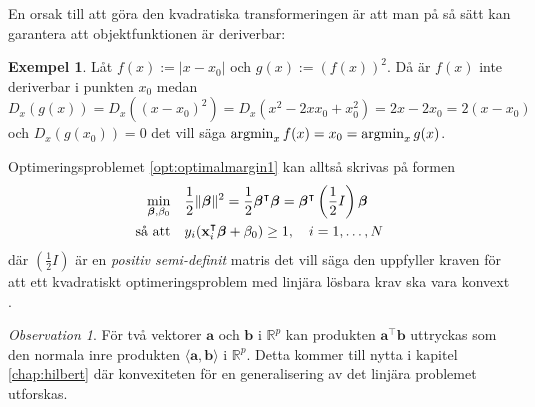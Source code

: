 \documentclass[a4paper, 12pt]{report}
\theoremstyle{definition}
\newtheorem{ex}{Exempel}[section]
\theoremstyle{remark}
\newtheorem*{rem}{Observation}
\newcommand{\bfbeta}{{\boldsymbol{\beta}}}
\begin{document}
En orsak till att göra den kvadratiska transformeringen är att man på så sätt kan garantera att objektfunktionen är deriverbar:
\begin{ex}
	Låt $f(x):=|x-x_0|$ och $g(x):=\left(f(x)\right)^2$. Då är $f(x)$ inte deriverbar i punkten $x_0$ medan $D_x\left(g(x)\right)=D_x\left(\left(x-x_0\right)^2\right)=D_x\left(x^2-2xx_0+x_0^2\right)=2x-2x_0=2(x-x_0)$ och $D_x\left(g(x_0)\right)=0$ det vill säga $\operatornamewithlimits{argmin}_x f(x) = x_0 = \operatornamewithlimits{argmin}_x g(x)$.
\end{ex}
Optimeringsproblemet \ref{opt:optimalmargin1} kan alltså skrivas på formen 
\begin{equation*}
\begin{aligned}
\operatornamewithlimits{min}_{\bfbeta,\beta_0} & & &\frac{1}{2}\|\bfbeta\|^2=\frac{1}{2}\bfbeta^\intercal\bfbeta=\bfbeta^\intercal\left(\frac{1}{2}I\right)\bfbeta\\
\text{så att} & & &y_i(\mathbf{x}_i^\intercal\bfbeta+\beta_0)\geq 1,\quad i=1,\dots,N
\end{aligned}
\end{equation*}
där $\left( \frac{1}{2}I \right)$ är en \emph{positiv semi-definit} matris det vill säga den uppfyller kraven för att ett kvadratiskt optimeringsproblem med linjära lösbara krav ska vara konvext \cite{Boyd}.

\begin{rem}
	För två vektorer $\mathbf{a}$ och $\mathbf{b}$ i $\mathbb{R}^p$ kan produkten $\mathbf{a}^\intercal\mathbf{b}$ uttryckas som den normala inre produkten $\langle \mathbf{a}, \mathbf{b} \rangle$ i $\mathbb{R}^p$. Detta kommer till nytta i kapitel \ref{chap:hilbert} där konvexiteten för en generalisering av det linjära problemet utforskas.
\end{rem}
\end{document}
